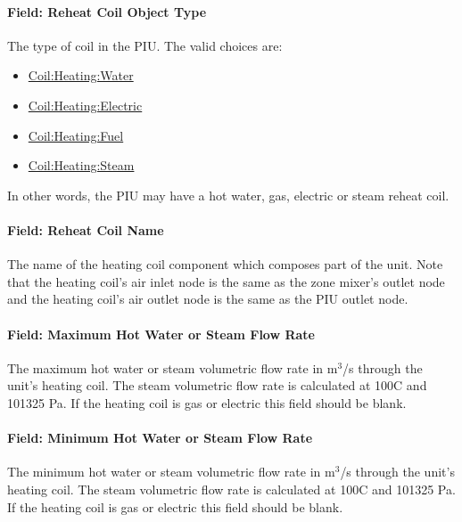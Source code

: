 \paragraph{Field: Reheat Coil Object Type}\label{field-reheat-coil-object-type-4}

The type of coil in the PIU. The valid choices are:

\begin{itemize}
\item
  \hyperref[coilheatingwater]{Coil:Heating:Water}
\item
  \hyperref[coilheatingelectric]{Coil:Heating:Electric}
\item
  \hyperref[coilheatinggas-000]{Coil:Heating:Fuel}
\item
  \hyperref[coilheatingsteam]{Coil:Heating:Steam}
\end{itemize}

In other words, the PIU may have a hot water, gas, electric or steam reheat coil.

\paragraph{Field: Reheat Coil Name}\label{field-reheat-coil-name-4}

The name of the heating coil component which composes part of the unit. Note that the heating coil's air inlet node is the same as the zone mixer's outlet node and the heating coil's air outlet node is the same as the PIU outlet node.

\paragraph{Field: Maximum Hot Water or Steam Flow Rate}\label{field-maximum-hot-water-or-steam-flow-rate-5}

The maximum hot water or steam volumetric flow rate in m\(^{3}\)/s through the unit's heating coil. The steam volumetric flow rate is calculated at 100C and 101325 Pa. If the heating coil is gas or electric this field should be blank.

\paragraph{Field: Minimum Hot Water or Steam Flow Rate}\label{field-minimum-hot-water-or-steam-flow-rate-5}

The minimum hot water or steam volumetric flow rate in m\(^{3}\)/s through the unit's heating coil. The steam volumetric flow rate is calculated at 100C and 101325 Pa. If the heating coil is gas or electric this field should be blank.

